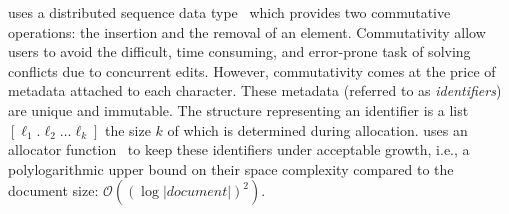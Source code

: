 \CRATE uses a distributed sequence data type~\cite{shapiro2011conflict} which
provides two commutative operations: the insertion and the removal of an
element. Commutativity allow users to avoid the difficult, time consuming, and
error-prone task of solving conflicts due to concurrent edits. However,
commutativity comes at the price of metadata attached to each character. These
metadata (referred to as \emph{identifiers}) are unique and immutable. The
structure representing an identifier is a list $[\ell_1.\ell_2\ldots\ell_k]$ the
size $k$ of which is determined during allocation. \CRATE uses an allocator
function~\cite{nedelec2013lseq} to keep these identifiers under acceptable
growth, i.e., a polylogarithmic upper bound on their space complexity compared
to the document size: $\mathcal{O}((\log |document|)^2)$.


%   


